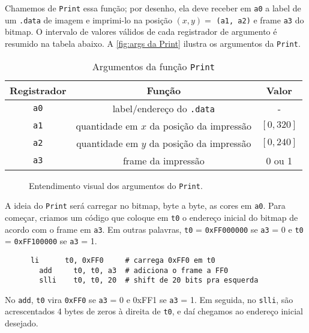 \documentclass[10pt, a4paper, twoside]{article}
\begin{document}
      Chamemos de {\tt Print} essa função; por desenho, ela deve receber em {\tt a0} a label de um {\tt .data} de imagem e imprimi-lo na posição $(x,y)=$ {\tt (a1, a2)} e frame {\tt a3} do bitmap. 
      O intervalo de valores válidos de cada registrador de argumento é resumido na tabela abaixo.
      A \autoref{fig:args da Print} ilustra os argumentos da {\tt Print}.
      \begin{table}[H]\centering
        \caption{Argumentos da função {\tt Print}}
        \begin{tabular}{ccc}
            \toprule 
            Registrador & Função & Valor \\
            \midrule\midrule
            {\tt a0} & label/endereço do {\tt .data}             & -          \\
            {\tt a1} & quantidade em $x$ da posição da impressão & $[0, 320]$ \\
            {\tt a2} & quantidade em $y$ da posição da impressão & $[0, 240]$ \\
            {\tt a3} & frame da impressão                        & 0 ou 1     \\
            \bottomrule
        \end{tabular}
      \end{table}
      \begin{figure}[H]\centering
          \caption{Entendimento visual dos argumentos do {\tt Print}.}
          \label{fig:args da Print}
          
      \end{figure}
      A ideia do {\tt Print} será carregar no bitmap, byte a byte, as cores em {\tt a0}.
      Para começar, criamos um código que coloque em {\tt t0} o endereço inicial do bitmap de acordo com o frame em {\tt a3}. Em outras palavras, 
      {\tt t0} = {\tt 0xFF000000} se {\tt a3} = 0 e
      {\tt t0} = {\tt 0xFF100000} se {\tt a3} = 1.
      \begin{lstlisting}
      li 	  t0, 0xFF0 	# carrega 0xFF0 em t0
	    add 	t0, t0, a3 	# adiciona o frame a FF0 
	    slli 	t0, t0, 20 	# shift de 20 bits pra esquerda 
      \end{lstlisting}
      No {\tt add}, 
      {\tt t0} vira {\tt 0xFF0} se {\tt a3} = 0 e 
      {0xFF1} se {\tt a3} = 1.
      Em seguida, no {\tt slli}, são acrescentados 4 bytes de zeros à direita de {\tt t0}, e daí chegamos ao endereço inicial desejado.
      
\end{document}
